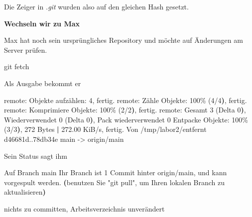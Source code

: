 \documentclass[
  letterpaper,
  DIV=11]{scrreprt}
\newenvironment{Shaded}{\begin{snugshade}}{\end{snugshade}}
\newcommand{\AttributeTok}[1]{\textcolor[rgb]{0.40,0.45,0.13}{#1}}
\newcommand{\ErrorTok}[1]{\textcolor[rgb]{0.68,0.00,0.00}{#1}}
\newcommand{\ExtensionTok}[1]{\textcolor[rgb]{0.00,0.23,0.31}{#1}}
\newcommand{\FunctionTok}[1]{\textcolor[rgb]{0.28,0.35,0.67}{#1}}
\newcommand{\KeywordTok}[1]{\textcolor[rgb]{0.00,0.23,0.31}{\textbf{#1}}}
\newcommand{\NormalTok}[1]{\textcolor[rgb]{0.00,0.23,0.31}{#1}}
\newcommand{\OperatorTok}[1]{\textcolor[rgb]{0.37,0.37,0.37}{#1}}
\newcommand{\StringTok}[1]{\textcolor[rgb]{0.13,0.47,0.30}{#1}}
\newcommand{\ordner}[1]{\textit{#1}\xspace}
\begin{document}
Die Zeiger in \ordner{.git} wurden also auf den gleichen Hash gesetzt.

\textbf{Wechseln wir zu Max}

Max hat noch sein ursprüngliches Repository und möchte auf Änderungen am
Server prüfen.

\begin{Shaded}
\begin{Highlighting}[]
\FunctionTok{git}\NormalTok{ fetch }
\end{Highlighting}
\end{Shaded}

Als Ausgabe bekommt er

\begin{Shaded}
\begin{Highlighting}[]
\ExtensionTok{remote:}\NormalTok{ Objekte aufzählen: 4, fertig.}
\ExtensionTok{remote:}\NormalTok{ Zähle Objekte: 100\% }\ErrorTok{(}\ExtensionTok{4/4}\KeywordTok{)}\ExtensionTok{,}\NormalTok{ fertig.}
\ExtensionTok{remote:}\NormalTok{ Komprimiere Objekte: 100\% }\ErrorTok{(}\ExtensionTok{2/2}\KeywordTok{)}\ExtensionTok{,}\NormalTok{ fertig.}
\ExtensionTok{remote:}\NormalTok{ Gesamt 3 }\ErrorTok{(}\ExtensionTok{Delta}\NormalTok{ 0}\KeywordTok{)}\ExtensionTok{,}\NormalTok{ Wiederverwendet 0 }\ErrorTok{(}\ExtensionTok{Delta}\NormalTok{ 0}\KeywordTok{)}\ExtensionTok{,}\NormalTok{ Pack wiederverwendet 0}
\ExtensionTok{Entpacke}\NormalTok{ Objekte: 100\% }\ErrorTok{(}\ExtensionTok{3/3}\KeywordTok{)}\ExtensionTok{,}\NormalTok{ 272 Bytes }\KeywordTok{|} \ExtensionTok{272.00}\NormalTok{ KiB/s, fertig.}
\ExtensionTok{Von}\NormalTok{ /tmp/labor2/entfernt}
   \ExtensionTok{d46681d..78db34e}\NormalTok{  main       }\AttributeTok{{-}}\OperatorTok{\textgreater{}}\NormalTok{ origin/main}
\end{Highlighting}
\end{Shaded}

Sein Status sagt ihm

\begin{Shaded}
\begin{Highlighting}[]
\ExtensionTok{Auf}\NormalTok{ Branch main}
\ExtensionTok{Ihr}\NormalTok{ Branch ist 1 Commit hinter }\StringTok{\textquotesingle{}origin/main\textquotesingle{}}\NormalTok{, und kann vorgespult werden.}
  \KeywordTok{(}\ExtensionTok{benutzen}\NormalTok{ Sie }\StringTok{"git pull"}\NormalTok{, um Ihren lokalen Branch zu aktualisieren}\KeywordTok{)}

\ExtensionTok{nichts}\NormalTok{ zu committen, Arbeitsverzeichnis unverändert}
\end{Highlighting}
\end{Shaded}
\end{document}
